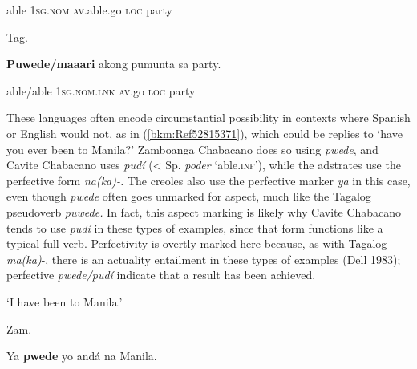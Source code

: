 \begin{stylelsIMT}
able \textsc{1sg.nom} \textsc{av}.able.go \textsc{loc} party\ \ 
\end{stylelsIMT}

\begin{listWWNumiileveli}
\item 
\begin{listWWNumiilevelii}
\item 
\begin{stylelsLanginfo}
Tag.
\end{stylelsLanginfo}
\end{listWWNumiilevelii}
\end{listWWNumiileveli}
\begin{stylelsSourceline}
\textbf{Puwede/maaari }akong pumunta sa party.
\end{stylelsSourceline}

\begin{styleStandard}
able/able \textsc{1sg.nom.lnk} \textsc{av}.go \textsc{loc} party
\end{styleStandard}

\begin{styleStandard}
These languages often encode circumstantial possibility in contexts where Spanish or English would not, as in (\ref{bkm:Ref52815371}), which could be replies to ‘have you ever been to Manila?’ Zamboanga Chabacano does so using \textit{pwede}, and Cavite Chabacano uses \textit{pudí} ({\textless} Sp. \textit{poder} ‘able.\textsc{inf}’), while the adstrates use the perfective form \textit{na(ka)-.} The creoles also use the perfective marker \textit{ya} in this case, even though \textit{pwede} often goes unmarked for aspect, much like the Tagalog pseudoverb \textit{puwede.} In fact, this aspect marking is likely why Cavite Chabacano tends to use \textit{pudí} in these types of examples, since that form functions like a typical full verb. Perfectivity is overtly marked here because, as with Tagalog \textit{ma(ka)}{}-, there is an actuality entailment in these types of examples (Dell 1983); perfective \textit{pwede/pudí} indicate that a result has been achieved.
\end{styleStandard}

\begin{listWWNumiileveli}
\item 
\begin{stylelsLanginfo}
\label{bkm:Ref52815371}‘I have been to Manila.’
\end{stylelsLanginfo}

\begin{listWWNumiilevelii}
\item 
\begin{stylelsLanginfo}
Zam.
\end{stylelsLanginfo}
\end{listWWNumiilevelii}
\end{listWWNumiileveli}
\begin{stylelsSourceline}
Ya \textbf{pwede} yo and\'{a} na Manila.
\end{stylelsSourceline}

